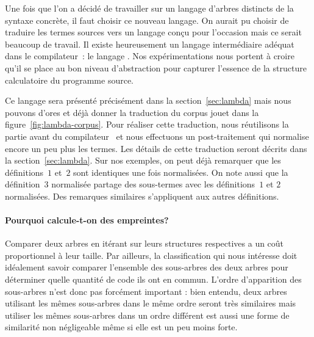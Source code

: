Une fois que l'on a décidé de travailler sur un langage d'arbres
distincts de la syntaxe concrète, il faut choisir ce nouveau langage.
On aurait pu choisir de traduire les termes sources vers un langage
conçu pour l'occasion mais ce serait beaucoup de travail. Il existe
heureusement un langage intermédiaire adéquat dans le
compilateur~{\OCaml}: le langage {\LambdaCode}. Nos expérimentations
nous portent à croire qu'il se place au bon niveau d'abstraction pour
capturer l'essence de la structure calculatoire du programme source.

Ce langage sera présenté précisément dans la section~\ref{sec:lambda}
mais nous pouvons d'ores et déjà donner la traduction du corpus jouet
dans la figure~\ref{fig:lambda-corpus}. Pour réaliser cette
traduction, nous réutilisons la partie avant du compilateur~{\OCaml}
et nous effectuons un post-traitement qui normalise encore un peu plus
les termes. Les détails de cette traduction seront décrits dans la
section~\ref{sec:lambda}. Sur nos exemples, on peut déjà
remarquer que les définitions~$1$ et~$2$ sont identiques une fois
normalisées. On note aussi que la définition~$3$ normalisée partage
des sous-termes avec les définitions~$1$ et $2$ normalisées. Des
remarques similaires s'appliquent aux autres définitions.



\paragraph{Pourquoi calcule-t-on des empreintes?}

Comparer deux arbres en itérant sur leurs structures respectives a un
coût proportionnel à leur taille. Par ailleurs, la classification qui
nous intéresse doit idéalement savoir comparer l'ensemble des
sous-arbres des deux arbres pour déterminer quelle quantité de code
ils ont en commun. L'ordre d'apparition des sous-arbres n'est donc pas
forcément important : bien entendu, deux arbres utilisant les mêmes
sous-arbres dans le même ordre seront très similaires mais utiliser
les mêmes sous-arbres dans un ordre différent est aussi une forme de
similarité non négligeable même si elle est un peu moins forte.

